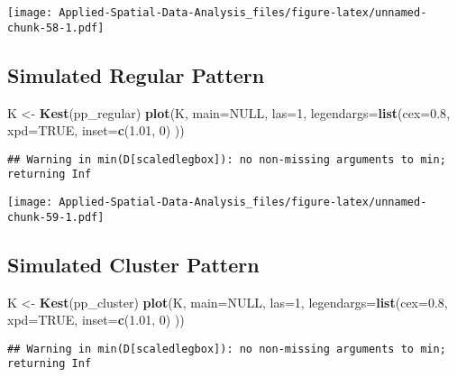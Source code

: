 \documentclass[
]{book}
\newenvironment{Shaded}{\begin{snugshade}}{\end{snugshade}}
\newcommand{\DataTypeTok}[1]{\textcolor[rgb]{0.13,0.29,0.53}{#1}}
\newcommand{\DecValTok}[1]{\textcolor[rgb]{0.00,0.00,0.81}{#1}}
\newcommand{\FloatTok}[1]{\textcolor[rgb]{0.00,0.00,0.81}{#1}}
\newcommand{\KeywordTok}[1]{\textcolor[rgb]{0.13,0.29,0.53}{\textbf{#1}}}
\newcommand{\NormalTok}[1]{#1}
\newcommand{\OtherTok}[1]{\textcolor[rgb]{0.56,0.35,0.01}{#1}}
\newcommand{\StringTok}[1]{\textcolor[rgb]{0.31,0.60,0.02}{#1}}
\begin{document}
\texttt{[image: Applied-Spatial-Data-Analysis\_files/figure-latex/unnamed-chunk-58-1.pdf]}

\hypertarget{simulated-regular-pattern-4}{%
\subsection{Simulated Regular Pattern}\label{simulated-regular-pattern-4}}

\begin{Shaded}
\begin{Highlighting}[]
\NormalTok{K <-}\StringTok{ }\KeywordTok{Kest}\NormalTok{(pp_regular)}
\KeywordTok{plot}\NormalTok{(K, }\DataTypeTok{main=}\OtherTok{NULL}\NormalTok{, }\DataTypeTok{las=}\DecValTok{1}\NormalTok{, }\DataTypeTok{legendargs=}\KeywordTok{list}\NormalTok{(}\DataTypeTok{cex=}\FloatTok{0.8}\NormalTok{, }\DataTypeTok{xpd=}\OtherTok{TRUE}\NormalTok{, }\DataTypeTok{inset=}\KeywordTok{c}\NormalTok{(}\FloatTok{1.01}\NormalTok{, }\DecValTok{0}\NormalTok{) ))}
\end{Highlighting}
\end{Shaded}

\begin{verbatim}
## Warning in min(D[scaledlegbox]): no non-missing arguments to min; returning Inf
\end{verbatim}

\texttt{[image: Applied-Spatial-Data-Analysis\_files/figure-latex/unnamed-chunk-59-1.pdf]}

\hypertarget{simulated-cluster-pattern-4}{%
\subsection{Simulated Cluster Pattern}\label{simulated-cluster-pattern-4}}

\begin{Shaded}
\begin{Highlighting}[]
\NormalTok{K <-}\StringTok{ }\KeywordTok{Kest}\NormalTok{(pp_cluster)}
\KeywordTok{plot}\NormalTok{(K, }\DataTypeTok{main=}\OtherTok{NULL}\NormalTok{, }\DataTypeTok{las=}\DecValTok{1}\NormalTok{, }\DataTypeTok{legendargs=}\KeywordTok{list}\NormalTok{(}\DataTypeTok{cex=}\FloatTok{0.8}\NormalTok{, }\DataTypeTok{xpd=}\OtherTok{TRUE}\NormalTok{, }\DataTypeTok{inset=}\KeywordTok{c}\NormalTok{(}\FloatTok{1.01}\NormalTok{, }\DecValTok{0}\NormalTok{) ))}
\end{Highlighting}
\end{Shaded}

\begin{verbatim}
## Warning in min(D[scaledlegbox]): no non-missing arguments to min; returning Inf
\end{verbatim}
\end{document}
